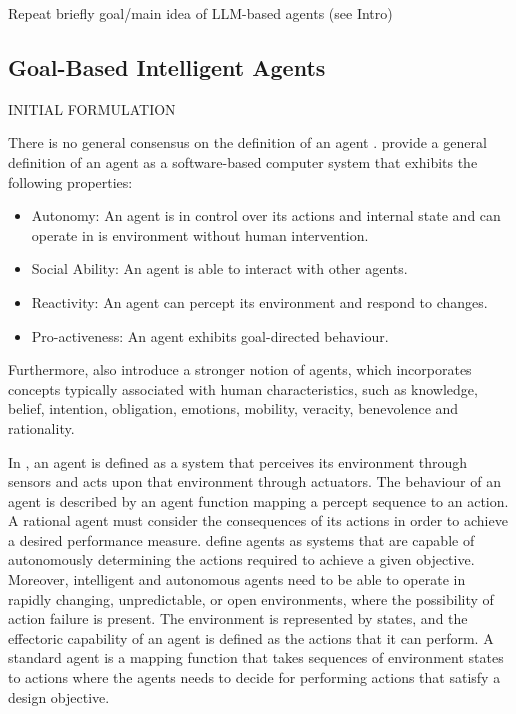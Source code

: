 \documentclass{article}
\begin{document}
Repeat briefly goal/main idea of LLM-based agents (see Intro)

\subsection{Goal-Based Intelligent Agents} %
INITIAL FORMULATION

There is no general consensus on the definition of an agent \cite{goos_intelligent_2002}. 
\cite{wooldridge_intelligent_1995} provide a general definition of an agent as a software-based computer system that exhibits the following properties: 
\begin{itemize}
	\item Autonomy: An agent is in control over its actions and internal state and can operate in is environment without human intervention.
	\item Social Ability: An agent is able to interact with other agents.
	\item Reactivity: An agent can percept its environment and respond to changes.
	\item Pro-activeness: An agent exhibits goal-directed behaviour.
\end{itemize}
Furthermore, \cite{wooldridge_intelligent_1995} also introduce a stronger notion of agents, which incorporates concepts typically associated with human characteristics, such as knowledge, belief, intention, obligation, emotions, mobility, veracity, benevolence and rationality.

In \cite{russell_artificial_2010}, an agent is defined as a system that perceives its environment through sensors and acts upon that environment through actuators. The behaviour of an agent is described by an agent function mapping a percept sequence to an action. A rational agent must consider the consequences of its actions in order to achieve a desired performance measure. 
\cite{goos_intelligent_2002} define agents as systems that are capable of autonomously determining the actions required to achieve a given objective. Moreover, intelligent and autonomous agents need to be able to operate in rapidly changing, unpredictable, or open environments, where the possibility of action failure is present. The environment is represented by states, and the effectoric capability of an agent is defined as the actions that it can perform. A standard agent is a mapping function that takes sequences of environment states to actions where the agents needs to decide for performing actions that satisfy a design objective.
\end{document}
